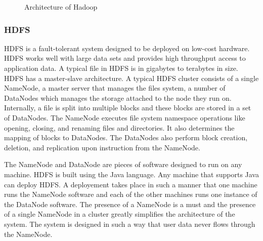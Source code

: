 \documentclass[9pt,twocolumn,twoside]{../../styles/osajnl}
\begin{document}
\begin{figure}[htbp]
\centering
{}
\caption{Architecture of Hadoop \cite{www-hdfs-fig}}
\label{fig:ansible}
\end{figure}

\subsubsection{HDFS}
HDFS is a fault-tolerant system designed to be deployed on low-cost hardware. HDFS works well with large data sets and provides high throughput access to application data.
A typical file in HDFS is in gigabytes to terabytes in size.  HDFS has a master-slave architecture. A typical HDFS cluster consists of a single NameNode, a master server that manages the files system, a number of DataNodes which manages the storage attached to the node they run on. Internally, a file is split into multiple blocks and these blocks are stored in a set of DataNodes. The NameNode executes file system namespace operations like opening, closing, and renaming files and directories. It also determines the mapping of blocks to DataNodes. The DataNodes also perform block creation, deletion, and replication upon instruction from the NameNode.

The NameNode and DataNode are pieces of software designed to run on any machine. HDFS is built using the Java language. Any machine that supports Java can deploy HDFS. A deployement takes place in such a manner that one machine runs the NameNode software and each of the other machines runs one instance of the DataNode software. The presence of a NameNode is a must and the presence of a single NameNode in a cluster greatly simplifies the architecture of the system. The system is designed in such a way that user data never flows through the NameNode.
\end{document}
